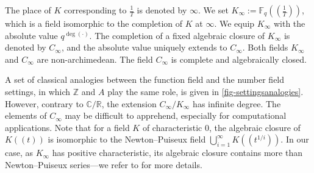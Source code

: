 \documentclass[11pt]{article}
\theoremstyle{definition}
\newcommand\C{\mathbb{C}}
\newcommand\Fq{\mathbb{F}_q}
\newcommand\R{\mathbb{R}}
\newcommand\Z{\mathbb{Z}}
\newcommand{\Kinf}{K_{\infty}}
\newcommand{\Cinf}{C_{\infty}}
\begin{document}
The place of $K$ corresponding to $\frac{1}{T}$ is denoted by $\infty$. We set $\Kinf := \Fq((\frac{1}{T}))$, which is a field isomorphic to the completion of $K$ at $\infty$. We equip $\Kinf$ with the absolute value $q^{\deg(\cdot)}$. The completion of a fixed algebraic closure of $\Kinf$ is denoted by $\Cinf$, and the absolute value uniquely extends to $\Cinf$. Both fields $\Kinf$ and $\Cinf$ are non-archimedean. The field $\Cinf$ is complete and algebraically closed. 

A set of classical analogies between the function field and the number field settings, in which $\Z$ and $A$ play the same role, is given in \cref{fig-settingsanalogies}. However, contrary to $\C/\R$, the extension $\Cinf/\Kinf$ has infinite degree. The elements of $\Cinf$ may be difficult to apprehend, especially for computational applications. Note that for a field $K$ of characteristic $0$, the algebraic closure of $K((t))$ is isomorphic to the Newton--Puiseux field $\bigcup_{i=1}^\infty K((t^{1/i}))$. In our case, as $\Kinf$ has positive characteristic, its algebraic closure contains more than Newton--Puiseux series---we refer to \cite{Kedlaya01} for more details.
\end{document}
